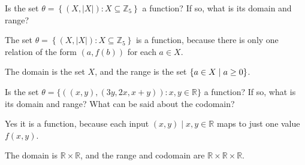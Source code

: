 \documentclass[openany, 12pt]{book}
\begin{document}
\begin{exercise}{}{}
	Is the set $\theta=\left\{(X,|X|): X \subseteq \mathbb{Z}_5\right\}$ a
	function? If so, what is its domain and range?
	\tcblower
	\begin{alist}
		\item The set $\theta=\left\{(X,|X|): X \subseteq \mathbb{Z}_5\right\}$
		is a function, because there is only one relation of the form $(a,
			f(b))$ for each $a\in X$.
		\item The domain is the set $X$, and the range is the set $\{a\in
				X\mid a\geq 0\}$.
	\end{alist}
\end{exercise}

\begin{exercise}{}{}
	Is the set $\theta=\{((x, y),(3 y, 2 x, x+y)): x, y \in \mathbb{R}\}$ a
	function? If so, what is its domain and range? What can be said about the
	codomain?
	\tcblower
	\begin{alist}
		\item Yes it is a function, because each input $(x, y)\mid x,
			y\in\mathbb{R}$ maps to just one value $f(x, y)$.
		\item The domain is $\mathbb{R}\times\mathbb{R}$, and the range and
		codomain are $\mathbb{R}\times\mathbb{R}\times\mathbb{R}$.
	\end{alist}
\end{exercise}







\printbibliography{}
\printindex{}
\end{document}
